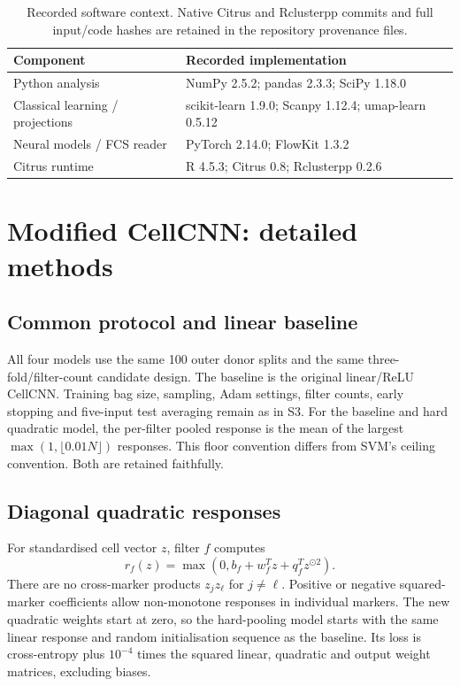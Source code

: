 \documentclass[11pt,a4paper]{article}
\begin{document}
\begin{table}[htb]\centering\small
\begin{tabular}{@{}ll@{}}\toprule
Component & Recorded implementation\\\midrule
Python analysis & NumPy 2.5.2; pandas 2.3.3; SciPy 1.18.0\\
Classical learning / projections & scikit-learn 1.9.0; Scanpy 1.12.4; umap-learn 0.5.12\\
Neural models / FCS reader & PyTorch 2.14.0; FlowKit 1.3.2\\
Citrus runtime & R 4.5.3; Citrus 0.8; Rclusterpp 0.2.6\\\bottomrule
\end{tabular}
\caption{Recorded software context. Native Citrus and Rclusterpp commits and full input/code hashes are retained in the repository provenance files.}
\end{table}

\clearpage
\section{Modified CellCNN: detailed methods}
\subsection{Common protocol and linear baseline}
All four models use the same 100 outer donor splits and the same three-fold/filter-count candidate design. The baseline is the original linear/ReLU CellCNN. Training bag size, sampling, Adam settings, filter counts, early stopping and five-input test averaging remain as in S3. For the baseline and hard quadratic model, the per-filter pooled response is the mean of the largest $\max(1,\lfloor0.01N\rfloor)$ responses. This floor convention differs from SVM's ceiling convention. Both are retained faithfully.

\subsection{Diagonal quadratic responses}
For standardised cell vector $z$, filter $f$ computes
\[
r_f(z)=\max\left(0,b_f+w_f^Tz+q_f^Tz^{\odot2}\right).
\]
There are no cross-marker products $z_jz_\ell$ for $j\ne\ell$. Positive or negative squared-marker coefficients allow non-monotone responses in individual markers. The new quadratic weights start at zero, so the hard-pooling model starts with the same linear response and random initialisation sequence as the baseline. Its loss is cross-entropy plus $10^{-4}$ times the squared linear, quadratic and output weight matrices, excluding biases.
\end{document}
